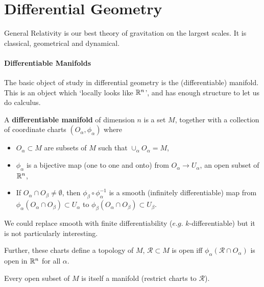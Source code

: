 \part{Differential Geometry}


General Relativity is our best theory of gravitation on the largest scales. It is classical, geometrical and dynamical.

\subsection{Differentiable Manifolds}

The basic object of study in differential geometry is the (differentiable) manifold. This is an object which `locally looks like $\mathbb{R}^{n}$', and has enough structure to let us do calculus.

\begin{definition}
    A \textbf{differentiable manifold} of dimension $n$ is a set $M$, together with a collection of coordinate charts $\left( O_\alpha, \phi_\alpha \right) $ where
    \begin{itemize}
        \item $O_{\alpha} \subset M$ are subsets of $M$ such that $\cup_{\alpha} O_\alpha = M$,
        \item $\phi_\alpha$ is a bijective map (one to one and onto) from $O_{\alpha} \to U_{\alpha}$, an open subset of $\mathbb{R}^{n}$,
        \item If $O_{\alpha} \cap O_{\beta} \neq \emptyset$, then $\phi_{\beta} \circ \phi_{\alpha}^{-1}$ is a smooth (infinitely differentiable) map from $\phi_{\alpha}\left( O_{\alpha} \cap O_{\beta} \right) \subset U_{\alpha}$ to $\phi_{\beta} \left( O_{\alpha} \cap O_{\beta} \right) \subset U_{\beta}$.
    \end{itemize}
\end{definition}

\begin{note}
    We could replace smooth with finite differentiability ($e.g.$ $k$-differentiable) but it is not particularly interesting.

    Further, these charts define a topology of $M$, $\mathcal{R} \subset M$ is open iff $\phi_{\alpha} \left( \mathcal{R} \cap O_{\alpha} \right) $ is open in $\mathbb{R}^{n}$ for all $\alpha$. 

    Every open subset of $M$ is itself a manifold (restrict charts to $\mathcal{R}$).
\end{note}

